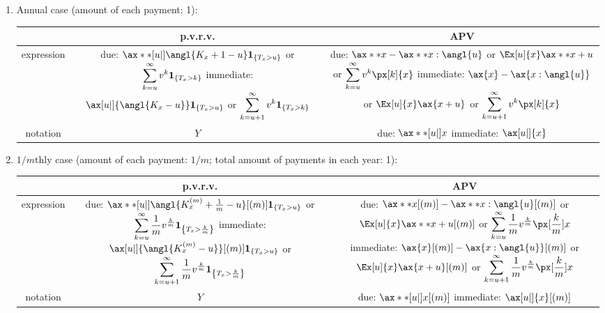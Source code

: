 \begin{enumerate}
\item \label{it:ann-defer-wl-annuity-fmlas}
Annual case (amount of each payment: 1):

\begin{tabular}{ccc} \toprule
&p.v.r.v.&APV \\
\midrule
expression&
\makecell{
due: \(\ax**[u|]{\angl{K_x+1-u}}\indicset{T_x>u}\) or
\(\displaystyle\sum_{k=u}^{\infty}v^k\mathbf{1}_{\left\{T_x>k\right\}}\) \\
immediate: \(\ax[u|]{\angl{K_x-u}}\indicset{T_x>u}\) or
\(\displaystyle\sum_{k=u+1}^{\infty}v^k\mathbf{1}_{\left\{T_x>k\right\}}\)
}
&\makecell{due: \(\ax**{x}-\ax**{x:\angl{u}}\) or
\(\Ex[u]{x}\ax**{x+u}\)\\
or
\(\displaystyle\sum_{k=u}^{\infty}v^k\px[k]{x}\)\\
immediate: \(\ax{x}-\ax{x:\angl{u}}\) or
\(\Ex[u]{x}\ax{x+u}\) \\
or \(\displaystyle\sum_{k=u+1}^{\infty}v^k\px[k]{x}\)
}\\
notation&\(Y\)&
\makecell{
due: \(\ax**[u|]{x}\)\\
immediate: \(\ax[u|]{x}\)\\
}
\\
\bottomrule
\end{tabular}

\item \label{it:1m-defer-wl-annuity-fmlas}
\(1/m\)thly case (amount of each payment: \(1/m\); total amount of
payments in each year: 1):

\begin{tabular}{ccc}
\toprule
&p.v.r.v.&APV \\
\midrule
expression&
\makecell{
due: \(\ax**[u|]{\angl{K_x^{(m)}+\frac{1}{m}-u}}[(m)]\indicset{T_x>u}\) or
\(\displaystyle\sum_{k=u}^{\infty}\frac{1}{m}v^{\frac{k}{m}}\mathbf{1}_{\left\{T_x>\frac{k}{m}\right\}}\) \\
immediate: \(\ax[u|]{\angl{K_x^{(m)}-u}}[(m)]\indicset{T_x>u}\) or
\(\displaystyle\sum_{k=u+1}^{\infty}\frac{1}{m}v^{\frac{k}{m}}\mathbf{1}_{\left\{T_x>\frac{k}{m}\right\}}\)
}
&\makecell{due: \(\ax**{x}[(m)]-\ax**{x:\angl{u}}[(m)]\) or
\(\Ex[u]{x}\ax**{x+u}[(m)]\)\\
or
\(\displaystyle\sum_{k=u}^{\infty}\frac{1}{m}v^{\frac{k}{m}}\px[\frac{k}{m}]{x}\)\\
immediate: \(\ax{x}[(m)]-\ax{x:\angl{u}}[(m)]\) or
\(\Ex[u]{x}\ax{x+u}[(m)]\) \\
or \(\displaystyle\sum_{k=u+1}^{\infty}\frac{1}{m}v^{\frac{k}{m}}\px[\frac{k}{m}]{x}\)
}\\
notation&\(Y\)&
\makecell{
due: \(\ax**[u|]{x}[(m)]\)\\
immediate: \(\ax[u|]{x}[(m)]\)\\
}
\\
\bottomrule
\end{tabular}
\end{enumerate}
